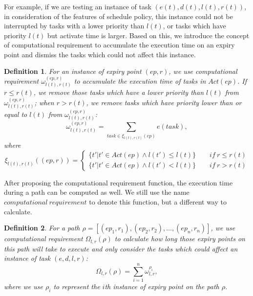 \documentclass[conference]{IEEEtran}
\newtheorem{definition}{Definition}
\begin{document}
For example, if we are testing an instance of task $(e(t),d(t),l(t),r(t))$, in consideration of the features of schedule policy, this instance could not be interrupted by tasks with a lower priority than $l(t)$, or tasks which have priority $l(t)$ but activate time is larger. Based on this, we introduce the concept of computational requirement to accumulate the execution time on an expiry point and dismiss the tasks which could not affect this instance.
\begin{definition}
For an instance of expiry point $(ep,r)$, we use computational requirement $\omega_{l(t),r(t)}^{(ep,r)}$ to accumulate the execution time of tasks in $Act(ep)$. If $r\leq r(t)$, we remove those tasks which have a lower priority than $l(t)$ from $\omega_{l(t),r(t)}^{(ep,r)}$; when $r>r(t)$, we remove tasks which have priority lower than or equal to $l(t)$ from $\omega_{l(t),r(t)}^{(ep,r)}$:
\begin{equation}
\omega_{l(t),r(t)}^{(ep,r)}=\sum\limits_{task\in \xi_{l(t),r(t)}(ep)}e(task),
\end{equation}\label{equation_loweromega}
where 
\[
\xi_{l(t),r(t)}((ep,r))=\begin{cases}\{t'|t'\in Act(ep)\wedge l(t')\leq l(t)\}\qquad if\ r\leq r(t)\\
\{t'|t'\in Act(ep)\wedge l(t')<l(t)\}\qquad if\ r>r(t)
\end{cases}\]
\end{definition}
After proposing the computational requirement function, the execution time during a path can be computed as well. We still use the name $computational\ requirement$ to denote this function, but a different way to calculate.
\begin{definition}
For a path $\rho=[(ep_1,r_1),(ep_2,r_2),\dots,(ep_n,r_n)]$, we use computational requirement $\Omega_{l,r}(\rho)$ to calculate how long those expiry points on this path will take to execute and only consider the tasks which could affect an instance of task $(e,d,l,r)$:
\begin{equation}
\Omega_{l,r}(\rho)=\sum_{i=1}^n\omega_{l,r}^{\rho_i},
\end{equation}\label{equation_higheromega}
where we use $\rho_i$ to represent the $i$th instance of expiry point on the path $\rho$.
\end{definition}
\end{document}
